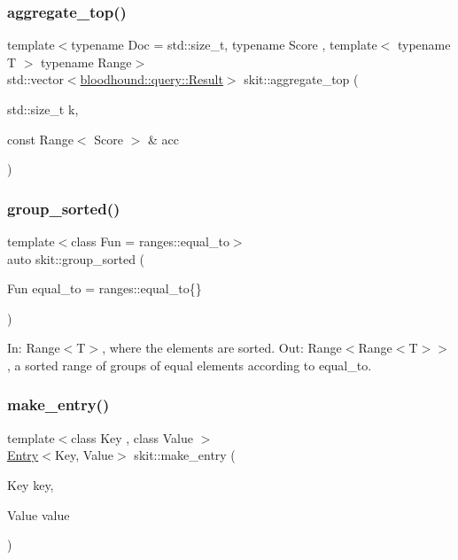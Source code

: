 \subsubsection{\texorpdfstring{aggregate\+\_\+top()}{aggregate\_top()}}
{\footnotesize\ttfamily template$<$typename Doc  = std\+::size\+\_\+t, typename Score , template$<$ typename T $>$ typename Range$>$ \\
std\+::vector$<$\hyperlink{structbloodhound_1_1query_1_1Result}{bloodhound\+::query\+::\+Result}$>$ skit\+::aggregate\+\_\+top (\begin{DoxyParamCaption}\item[{std\+::size\+\_\+t}]{k,  }\item[{const Range$<$ Score $>$ \&}]{acc }\end{DoxyParamCaption})}

\mbox{\label{namespaceskit_aad93ce20d3eee4cb9dea8ed3986f93a5}} 
\subsubsection{\texorpdfstring{group\+\_\+sorted()}{group\_sorted()}}
{\footnotesize\ttfamily template$<$class Fun  = ranges\+::equal\+\_\+to$>$ \\
auto skit\+::group\+\_\+sorted (\begin{DoxyParamCaption}\item[{Fun}]{equal\+\_\+to = {\ttfamily ranges\+:\+:equal\+\_\+to\{\}} }\end{DoxyParamCaption})}

In\+: Range$<$\+T$>$, where the elements are sorted. Out\+: Range$<$Range$<$\+T$>$$>$, a sorted range of groups of equal elements according to {\ttfamily equal\+\_\+to}. \mbox{\label{namespaceskit_a33324a7bd87ff2a6800c5b530cb46a7f}} 
\subsubsection{\texorpdfstring{make\+\_\+entry()}{make\_entry()}}
{\footnotesize\ttfamily template$<$class Key , class Value $>$ \\
\hyperlink{structskit_1_1Entry}{Entry}$<$Key, Value$>$ skit\+::make\+\_\+entry (\begin{DoxyParamCaption}\item[{Key}]{key,  }\item[{Value}]{value }\end{DoxyParamCaption})}

